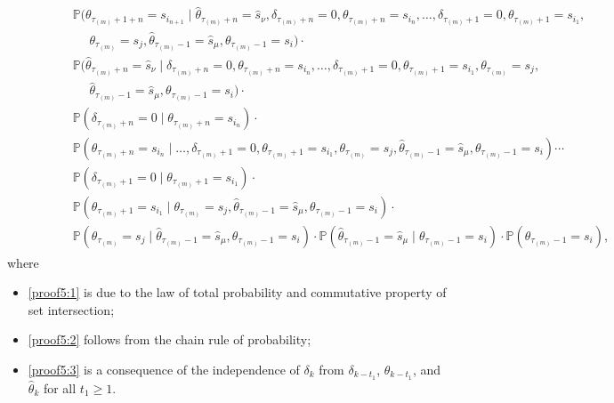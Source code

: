 \documentclass[journal,twoside,web]{ieeecolor}
\begin{document}
\begin{figure*}[ht]
\begin{align}
\begin{aligned}
& \qquad\quad~~~\! \mathbb{P}(\theta_{\tau_{(m)}+1+n}=s_{i_{n+1}} \mid \hat{\theta}_{\tau_{(m)}+n} = \hat{s}_{\nu}, \delta_{\tau_{(m)}+n}=0, \theta_{\tau_{(m)}+n}=s_{i_{n}},\dots,\delta_{\tau_{(m)}+1}=0,\theta_{\tau_{(m)}+1}=s_{i_{1}}, \\
& \qquad\qquad\quad\! \theta_{\tau_{(m)}}=s_j,\hat{\theta}_{\tau_{(m)}-1} = \hat{s}_{\mu},\theta_{\tau_{(m)}-1}=s_i)\cdot \\
& \qquad\quad~~~\! \mathbb{P}(\hat{\theta}_{\tau_{(m)}+n} = \hat{s}_{\nu} \mid \delta_{\tau_{(m)}+n}=0, \theta_{\tau_{(m)}+n}=s_{i_{n}},\dots,\delta_{\tau_{(m)}+1}=0,\theta_{\tau_{(m)}+1}=s_{i_{1}},\theta_{\tau_{(m)}}=s_j, \\
& \qquad\qquad\quad\! \hat{\theta}_{\tau_{(m)}-1} = \hat{s}_{\mu},\theta_{\tau_{(m)}-1}=s_i)\cdot \\
& \qquad\quad~~~\! \mathbb{P}(\delta_{\tau_{(m)}+n}=0 \mid \theta_{\tau_{(m)}+n}=s_{i_{n}})\cdot \\
& \qquad\quad~~~\!\mathbb{P}(\theta_{\tau_{(m)}+n}=s_{i_{n}}\mid\dots,\delta_{\tau_{(m)}+1}=0,\theta_{\tau_{(m)}+1}=s_{i_{1}},\theta_{\tau_{(m)}}=s_j, \hat{\theta}_{\tau_{(m)}-1} = \hat{s}_{\mu},\theta_{\tau_{(m)}-1}=s_i)\cdots \\
& \qquad\quad~~~\!
\mathbb{P}(\delta_{\tau_{(m)}+1}=0 \mid \theta_{\tau_{(m)}+1}=s_{i_{1}})\cdot \\
& \qquad\quad~~~\!
\mathbb{P}(\theta_{\tau_{(m)}+1}=s_{i_{1}} \mid \theta_{\tau_{(m)}}=s_j, \hat{\theta}_{\tau_{(m)}-1} = \hat{s}_{\mu},\theta_{\tau_{(m)}-1}=s_i)\cdot \\
& \qquad\quad~~~\!
\mathbb{P}(\theta_{\tau_{(m)}}=s_j \mid \hat{\theta}_{\tau_{(m)}-1} = \hat{s}_{\mu},\theta_{\tau_{(m)}-1}=s_i)\cdot 
\mathbb{P}(\hat{\theta}_{\tau_{(m)}-1} = \hat{s}_{\mu}\mid\theta_{\tau_{(m)}-1}=s_i) \cdot 
\mathbb{P}(\theta_{\tau_{(m)}-1}=s_i),
\end{aligned}
\end{align}
where 
\begin{itemize}
    \item \eqref{proof5:1} is due to the law of total probability and commutative property of set intersection;
    \item \eqref{proof5:2} follows from the chain rule of probability;
    \item \eqref{proof5:3} is a consequence of the independence of $\delta_{k}$ from $\delta_{k-t_{1}}$, $\theta_{k-t_{1}}$, and $\hat{\theta}_{k}$ for all $t_{1}\geq 1$.
\end{itemize}
\end{figure*}
\end{document}
